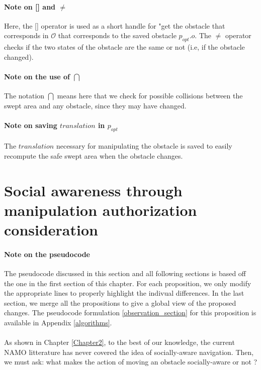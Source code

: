 \paragraph{Note on [] and $\neq$}\label{operators_note} Here, the [] operator is used as a short handle for "get the obstacle that corresponds in $\mathcal{O}$ that corresponds to the saved obstacle $p_{opt}.o$. The $\neq$ operator checks if the two states of the obstacle are the same or not (i.e, if the obstacle changed).

\paragraph{Note on the use of $\bigcap$}\label{area_intersect_note} The notation $\bigcap$ means here that we check for possible collisions between the swept area and any obstacle, since they may have changed.

\paragraph{Note on saving $translation$ in $p_{opt}$}\label{translation_note} The $translation$ necessary for manipulating the obstacle is saved to easily recompute the safe swept area when the obstacle changes.

\section{Social awareness through manipulation authorization consideration}

\paragraph{Note on the pseudocode} The pseudocode discussed in this section and all following sections is based off the one in the first section of this chapter. For each proposition, we only modify the appropriate lines to properly highlight the indivual differences. In the last section, we merge all the propositions to give a global view of the proposed changes. The pseudocode formulation \ref{observation_section} for this proposition is available in Appendix \ref{algorithms}.

\paragraph{} As shown in Chapter \ref{Chapter2}, to the best of our knowledge, the current NAMO litterature has never covered the idea of socially-aware navigation. Then, we must ask: what makes the action of moving an obstacle socially-aware or not ?

